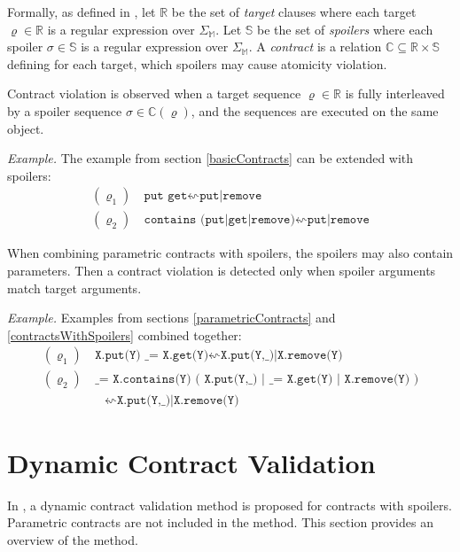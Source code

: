
Formally, as defined in \cite{contracts}, let $\mathbb{R}$ be the set of
\emph{target} clauses where each target $\varrho \in \mathbb{R}$ is a regular
expression over $\Sigma_\mathbb{M}$. Let $\mathbb{S}$ be the set of
\emph{spoilers} where each spoiler $\sigma \in \mathbb{S}$ is a regular
expression over $\Sigma_\mathbb{M}$. A \emph{contract} is a relation $\mathbb{C}
\subseteq \mathbb{R} \times \mathbb{S}$ defining for each target, which spoilers
may cause atomicity violation.

Contract violation is observed when a target sequence $\varrho \in \mathbb{R}$
is fully interleaved by a spoiler sequence $\sigma \in \mathbb{C}(\varrho)$, and
the sequences are executed on the same object.

\emph{Example.} The example from section \ref{basicContracts} can be extended
with spoilers:
\begin{align*}
    (\varrho_1) &\ \texttt{put get} \leftsquigarrow \texttt{put|remove}\\
    (\varrho_2) &\ \texttt{contains (put|get|remove)} \leftsquigarrow
    \texttt{put|remove}
\end{align*}

When combining parametric contracts with spoilers, the spoilers may also contain
parameters. Then a contract violation is detected only when spoiler arguments
match target arguments.

\emph{Example.} Examples from sections \ref{parametricContracts} and
\ref{contractsWithSpoilers} combined together:
\begin{align*}
    (\varrho_1) &\ \texttt{X.put(Y) \_ = X.get(Y)} \leftsquigarrow
    \texttt{X.put(Y,\_)|X.remove(Y)}\\
    (\varrho_2) &\ \texttt{\_ = X.contains(Y) ( X.put(Y,\_) | \_ = X.get(Y) |
    X.remove(Y) )}\\
    &\quad \leftsquigarrow \texttt{X.put(Y,\_)|X.remove(Y)}
\end{align*}


\section{Dynamic Contract Validation}

In \cite{contracts}, a dynamic contract validation method is proposed for
contracts with spoilers. Parametric contracts are not included in the method.
This section provides an overview of the method.

